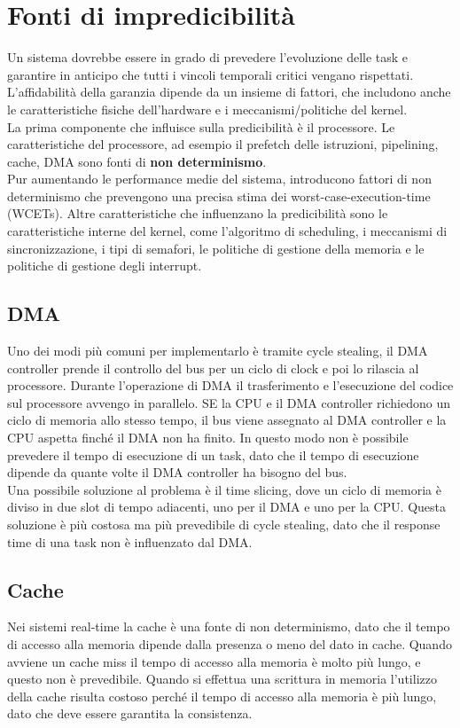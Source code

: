 \documentclass[12pt]{article}
\begin{document}
\section{Fonti di impredicibilità}
Un sistema dovrebbe essere in grado di prevedere l'evoluzione delle task e garantire in anticipo che tutti i vincoli temporali critici 
vengano rispettati.
L'affidabilità della garanzia dipende da un insieme di fattori, che includono anche le caratteristiche fisiche dell'hardware e 
i meccanismi/politiche del kernel.
\\
La prima componente che influisce sulla predicibilità è il processore. Le caratteristiche del processore, ad esempio il prefetch delle istruzioni, 
pipelining, cache, DMA sono fonti di \textbf{non determinismo}.
\\
Pur aumentando le performance medie del sistema, introducono fattori di non determinismo che prevengono una precisa stima dei worst-case-execution-time (WCETs).
Altre caratteristiche che influenzano la predicibilità sono le caratteristiche interne del kernel, come l'algoritmo di scheduling, i meccanismi di sincronizzazione, 
i tipi di semafori, le politiche di gestione della memoria e le politiche di gestione degli interrupt.
\subsection{DMA}
Uno dei modi più comuni per implementarlo è tramite cycle stealing, il DMA controller prende il controllo del bus per un ciclo di clock 
e poi lo rilascia al processore.
Durante l'operazione di DMA il trasferimento e l'esecuzione del codice sul processore avvengo in parallelo.
SE la CPU e il DMA controller richiedono un ciclo di memoria allo stesso tempo, il bus viene assegnato al DMA controller e la CPU
aspetta finché il DMA non ha finito.
In questo modo non è possibile prevedere il tempo di esecuzione di un task, dato che il tempo di esecuzione dipende da quante volte il DMA controller ha bisogno del bus.
\\
Una possibile soluzione al problema è il time slicing, dove un ciclo di memoria è diviso in due slot di tempo adiacenti, uno per il DMA e uno per la CPU.
Questa soluzione è più costosa ma più prevedibile di cycle stealing, dato che il response time di una task non è influenzato dal DMA.
\subsection{Cache}
Nei sistemi real-time la cache è una fonte di non determinismo, dato che il tempo di accesso alla memoria dipende dalla presenza o meno del dato in cache.
Quando avviene un cache miss il tempo di accesso alla memoria è molto più lungo, e questo non è prevedibile.
Quando si effettua una scrittura in memoria l'utilizzo della cache risulta costoso perché il tempo di accesso alla memoria è più lungo, dato che deve essere garantita la consistenza.
\end{document}
